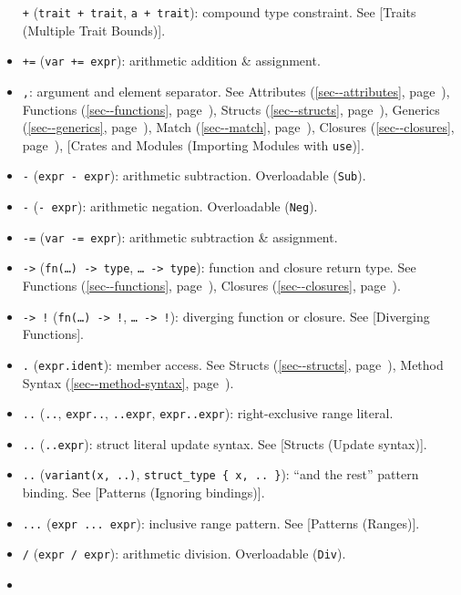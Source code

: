 \documentclass[a4paper,]{book}
\renewcommand*{\hyperref}[2][\ar]{%
  \def\ar{#2}%
  #2 (\autoref{#1}, page~\pageref{#1})}
\begin{document}
\begin{itemize}
  \texttt{+} (\texttt{trait\ +\ trait},
  \texttt{\textquotesingle{}a\ +\ trait}): compound type constraint. See
  {[}Traits (Multiple Trait Bounds){]}.
\item
  \texttt{+=} (\texttt{var\ +=\ expr}): arithmetic addition \&
  assignment.
\item
  \texttt{,}: argument and element separator. See
  \hyperref[sec--attributes]{Attributes},
  \hyperref[sec--functions]{Functions},
  \hyperref[sec--structs]{Structs}, \hyperref[sec--generics]{Generics},
  \hyperref[sec--match]{Match}, \hyperref[sec--closures]{Closures},
  {[}Crates and Modules (Importing Modules with \texttt{use}){]}.
\item
  \texttt{-} (\texttt{expr\ -\ expr}): arithmetic subtraction.
  Overloadable (\texttt{Sub}).
\item
  \texttt{-} (\texttt{-\ expr}): arithmetic negation. Overloadable
  (\texttt{Neg}).
\item
  \texttt{-=} (\texttt{var\ -=\ expr}): arithmetic subtraction \&
  assignment.
\item
  \texttt{-\textgreater{}}
  (\texttt{fn(\ldots{})\ -\textgreater{}\ type},
  \texttt{\textbar{}\ldots{}\textbar{}\ -\textgreater{}\ type}):
  function and closure return type. See
  \hyperref[sec--functions]{Functions},
  \hyperref[sec--closures]{Closures}.
\item
  \texttt{-\textgreater{}\ !}
  (\texttt{fn(\ldots{})\ -\textgreater{}\ !},
  \texttt{\textbar{}\ldots{}\textbar{}\ -\textgreater{}\ !}): diverging
  function or closure. See {[}Diverging Functions{]}.
\item
  \texttt{.} (\texttt{expr.ident}): member access. See
  \hyperref[sec--structs]{Structs}, \hyperref[sec--method-syntax]{Method
  Syntax}.
\item
  \texttt{..} (\texttt{..}, \texttt{expr..}, \texttt{..expr},
  \texttt{expr..expr}): right-exclusive range literal.
\item
  \texttt{..} (\texttt{..expr}): struct literal update syntax. See
  {[}Structs (Update syntax){]}.
\item
  \texttt{..} (\texttt{variant(x,\ ..)},
  \texttt{struct\_type\ \{\ x,\ ..\ \}}): ``and the rest'' pattern
  binding. See {[}Patterns (Ignoring bindings){]}.
\item
  \texttt{...} (\texttt{expr\ ...\ expr}): inclusive range pattern. See
  {[}Patterns (Ranges){]}.
\item
  \texttt{/} (\texttt{expr\ /\ expr}): arithmetic division. Overloadable
  (\texttt{Div}).
\item

\end{itemize}
\end{document}
